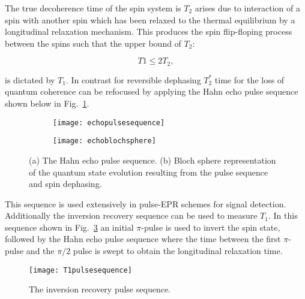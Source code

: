 The true decoherence time of the spin system is $T_{2}$ arises due to interaction of a spin with another spin which has been relaxed to the thermal equilibrium by a longitudinal relaxation mechanism. This produces the spin flip-floping process between the spins such that the upper bound of $T_{2}$:

\begin{equation}
\label{eq:T2upper}
T1 \leq 2T_{2}, 
\end{equation}

\noindent is dictated by $T_{1}$. In contrast for reversible dephasing $T_{2}^{*}$ time for the loss of quantum coherence can be refocused by applying the Hahn echo pulse sequence shown below in Fig.~\ref{fig:echopulsesequence}.

\begin{figure}[H]
    \centering
    \begin{subfigure}[b]{0.6\textwidth}
        \centering
        \texttt{[image: echopulsesequence]}
        \caption{\label{fig:echopulsesequence}}
    \end{subfigure}
    \begin{subfigure}[b]{0.6\textwidth}
        \centering
        \texttt{[image: echoblochsphere]}
   \caption{}
   \end{subfigure}
   \caption{(a) The Hahn echo pulse sequence. (b) Bloch sphere representation of the quantum state evolution resulting from the pulse sequence and spin dephasing.}
   \label{fig:blochsphererep}
\end{figure}

\noindent This sequence is used extensively in pulse-EPR schemes for signal detection. Additionally the inversion recovery sequence can be used to measure $T_{1}$. In this sequence shown in Fig.~\ref{fig:T1pulsesequence} an initial $\pi$-pulse is used to invert the spin state, followed by the Hahn echo pulse sequence where the time between the first $\pi$-pulse and the $\pi/2$ pulse is swept to obtain the longitudinal relaxation time. 



\begin{figure}[h]
\centering
\texttt{[image: T1pulsesequence]}
\caption{\label{fig:T1pulsesequence} The inversion recovery pulse sequence.}
\end{figure}
 
















